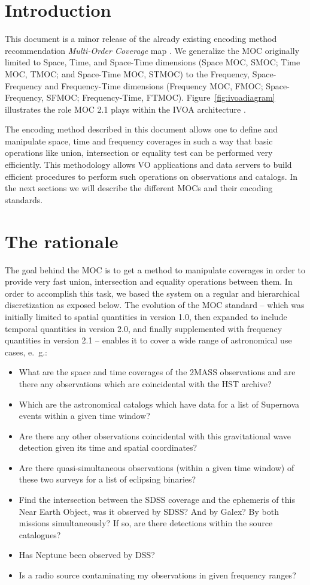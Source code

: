 \documentclass[11pt,a4paper]{ivoa}
\begin{document}
\section{Introduction}
This document is a minor release of the already existing encoding method
recommendation \emph{Multi-Order Coverage} map
\citep[MOC~2.0,][]{2022ivoa.spec.0727F}.
We generalize the MOC originally limited to Space, Time, and Space-Time
dimensions (Space MOC, SMOC; Time MOC, TMOC; and Space-Time MOC, STMOC)
to the Frequency, Space-Frequency and Frequency-Time dimensions
(Frequency MOC, FMOC; Space-Frequency, SFMOC; Frequency-Time, FTMOC).
Figure~\ref{fig:ivoadiagram} illustrates the role MOC 2.1
plays within the IVOA architecture \citep{2021ivoa.spec.1101D}.

The encoding method described in this document allows one to define
and manipulate space, time and frequency coverages in such a way that basic
operations like union, intersection or equality test can be performed
very efficiently. This methodology allows VO applications and
data servers to build efficient
procedures to perform such operations on observations and catalogs.
In the next sections we will describe the different MOCs and their
encoding standards.

\section{The rationale}
\label{sec:usecases}
The goal behind the MOC is to get a method to manipulate coverages in
order to provide very fast union, intersection and
equality operations between them. In order to accomplish this task, we
based the system on a regular and hierarchical discretization as
exposed below.
The evolution of the MOC standard -- which was initially limited to spatial
quantities in version 1.0, then expanded to include temporal quantities in
version 2.0, and finally supplemented with frequency quantities in version
2.1 -- enables it to cover a wide range of astronomical use cases, e.~g.:
\begin{itemize}
\item What are the space and time coverages of the 2MASS observations
  and are there any observations which are coincidental with the HST
  archive?
\item Which are the astronomical catalogs which have data for a list
  of Supernova events within a given time window?
\item Are there any other observations coincidental with this
  gravitational wave detection given its time and spatial coordinates?
\item Are there quasi-simultaneous observations (within a given time
  window) of these two surveys for a list of eclipsing binaries?
\item Find the intersection between the SDSS coverage and the
  ephemeris of this Near Earth Object, was it observed by SDSS? And
  by Galex? By both missions simultaneously? If so, are there
  detections within the source catalogues?
\item Has Neptune been observed by DSS?
\item Is a radio source contaminating my observations in given frequency
  ranges?
\end{itemize}
\end{document}
